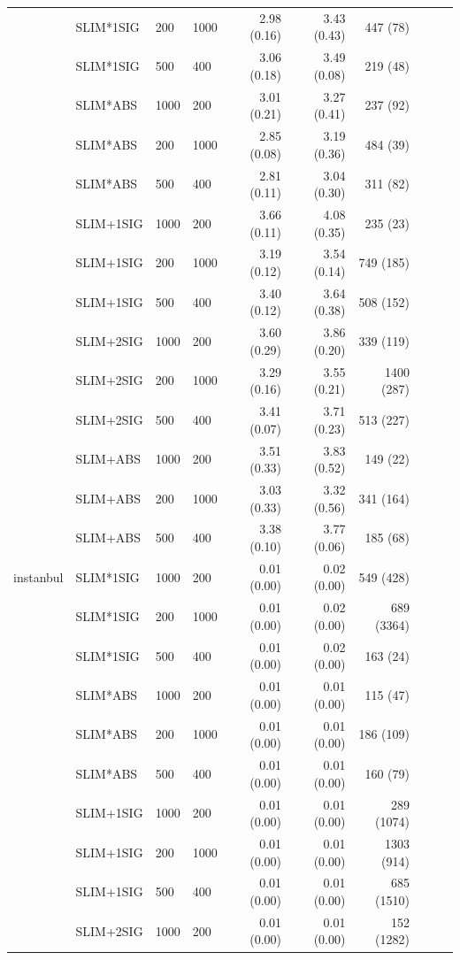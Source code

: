 \begin{longtable}{llllrrrrrr}
 & SLIM*1SIG & 200 & 1000 & 2.98 (0.16) & 3.43 (0.43) & 447 (78) \\
 & SLIM*1SIG & 500 & 400 & 3.06 (0.18) & 3.49 (0.08) & 219 (48) \\
 & SLIM*ABS & 1000 & 200 & 3.01 (0.21) & 3.27 (0.41) & 237 (92) \\
 & SLIM*ABS & 200 & 1000 & 2.85 (0.08) & 3.19 (0.36) & 484 (39) \\
 & SLIM*ABS & 500 & 400 & 2.81 (0.11) & 3.04 (0.30) & 311 (82) \\
 & SLIM+1SIG & 1000 & 200 & 3.66 (0.11) & 4.08 (0.35) & 235 (23) \\
 & SLIM+1SIG & 200 & 1000 & 3.19 (0.12) & 3.54 (0.14) & 749 (185) \\
 & SLIM+1SIG & 500 & 400 & 3.40 (0.12) & 3.64 (0.38) & 508 (152) \\
 & SLIM+2SIG & 1000 & 200 & 3.60 (0.29) & 3.86 (0.20) & 339 (119) \\
 & SLIM+2SIG & 200 & 1000 & 3.29 (0.16) & 3.55 (0.21) & 1400 (287) \\
 & SLIM+2SIG & 500 & 400 & 3.41 (0.07) & 3.71 (0.23) & 513 (227) \\
 & SLIM+ABS & 1000 & 200 & 3.51 (0.33) & 3.83 (0.52) & 149 (22) \\
 & SLIM+ABS & 200 & 1000 & 3.03 (0.33) & 3.32 (0.56) & 341 (164) \\
 & SLIM+ABS & 500 & 400 & 3.38 (0.10) & 3.77 (0.06) & 185 (68) \\
\midrule
instanbul & SLIM*1SIG & 1000 & 200 & 0.01 (0.00) & 0.02 (0.00) & 549 (428) \\
 & SLIM*1SIG & 200 & 1000 & 0.01 (0.00) & 0.02 (0.00) & 689 (3364) \\
 & SLIM*1SIG & 500 & 400 & 0.01 (0.00) & 0.02 (0.00) & 163 (24) \\
 & SLIM*ABS & 1000 & 200 & 0.01 (0.00) & 0.01 (0.00) & 115 (47) \\
 & SLIM*ABS & 200 & 1000 & 0.01 (0.00) & 0.01 (0.00) & 186 (109) \\
 & SLIM*ABS & 500 & 400 & 0.01 (0.00) & 0.01 (0.00) & 160 (79) \\
 & SLIM+1SIG & 1000 & 200 & 0.01 (0.00) & 0.01 (0.00) & 289 (1074) \\
 & SLIM+1SIG & 200 & 1000 & 0.01 (0.00) & 0.01 (0.00) & 1303 (914) \\
 & SLIM+1SIG & 500 & 400 & 0.01 (0.00) & 0.01 (0.00) & 685 (1510) \\
 & SLIM+2SIG & 1000 & 200 & 0.01 (0.00) & 0.01 (0.00) & 152 (1282) \\

\end{longtable}
